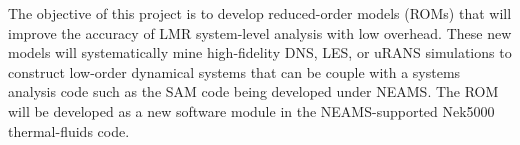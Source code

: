 The objective of this project is to develop reduced-order models (ROMs) that will improve the accuracy of LMR system-level analysis with low overhead. These new models will systematically mine high-fidelity DNS, LES, or uRANS simulations to construct low-order dynamical systems that can be couple with a systems analysis code such as the SAM code being developed under NEAMS. The ROM will be developed as a new software module in the NEAMS-supported Nek5000 thermal-fluids code.
